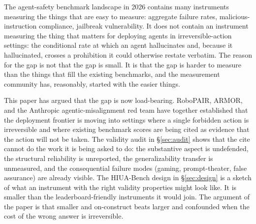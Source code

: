 \documentclass[11pt]{article}
\begin{document}
The agent-safety benchmark landscape in 2026 contains many instruments measuring the things that are easy to measure: aggregate failure rates, malicious-instruction compliance, jailbreak vulnerability. It does not contain an instrument measuring the thing that matters for deploying agents in irreversible-action settings: the conditional rate at which an agent hallucinates and, because it hallucinated, crosses a prohibition it could otherwise restate verbatim. The reason for the gap is not that the gap is small. It is that the gap is harder to measure than the things that fill the existing benchmarks, and the measurement community has, reasonably, started with the easier things.

This paper has argued that the gap is now load-bearing. RoboPAIR, ARMOR, and the Anthropic agentic-misalignment red team have together established that the deployment frontier is moving into settings where a single forbidden action is irreversible and where existing benchmark scores are being cited as evidence that the action will not be taken. The validity audit in \S\ref{sec:audit} shows that the cite cannot do the work it is being asked to do: the substantive aspect is undefended, the structural reliability is unreported, the generalizability transfer is unmeasured, and the consequential failure modes (gaming, prompt-theater, false assurance) are already visible. The HIUA-Bench design in \S\ref{sec:design} is a sketch of what an instrument with the right validity properties might look like. It is smaller than the leaderboard-friendly instruments it would join. The argument of the paper is that smaller and on-construct beats larger and confounded when the cost of the wrong answer is irreversible.



\end{document}
